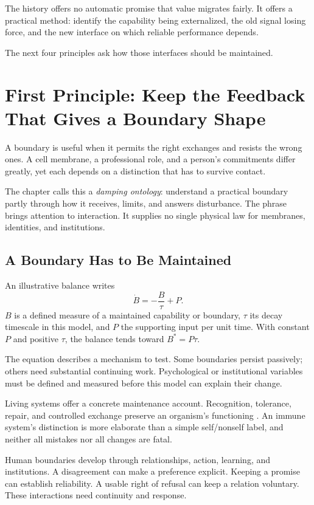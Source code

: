 \documentclass[11pt,openany]{book}
\begin{document}
The history offers no automatic promise that value migrates fairly. It offers a practical method: identify the capability being externalized, the old signal losing force, and the new interface on which reliable performance depends.

The next four principles ask how those interfaces should be maintained.

\section{First Principle: Keep the Feedback That Gives a Boundary Shape}

A boundary is useful when it permits the right exchanges and resists the wrong ones. A cell membrane, a professional role, and a person's commitments differ greatly, yet each depends on a distinction that has to survive contact.

The chapter calls this a \emph{damping ontology}: understand a practical boundary partly through how it receives, limits, and answers disturbance. The phrase brings attention to interaction. It supplies no single physical law for membranes, identities, and institutions.

\subsection{A Boundary Has to Be Maintained}

An illustrative balance writes
\begin{equation}
 \dot B=-\frac{B}{\tau}+P.
\end{equation}
$B$ is a defined measure of a maintained capability or boundary, $\tau$ its decay timescale in this model, and $P$ the supporting input per unit time. With constant $P$ and positive $\tau$, the balance tends toward $B^\ast=P\tau$.

The equation describes a mechanism to test. Some boundaries persist passively; others need substantial continuing work. Psychological or institutional variables must be defined and measured before this model can explain their change.

Living systems offer a concrete maintenance account. Recognition, tolerance, repair, and controlled exchange preserve an organism's functioning \cite{burnet1959clonal}. An immune system's distinction is more elaborate than a simple self/nonself label, and neither all mistakes nor all changes are fatal.

Human boundaries develop through relationships, action, learning, and institutions. A disagreement can make a preference explicit. Keeping a promise can establish reliability. A usable right of refusal can keep a relation voluntary. These interactions need continuity and response.
\end{document}
